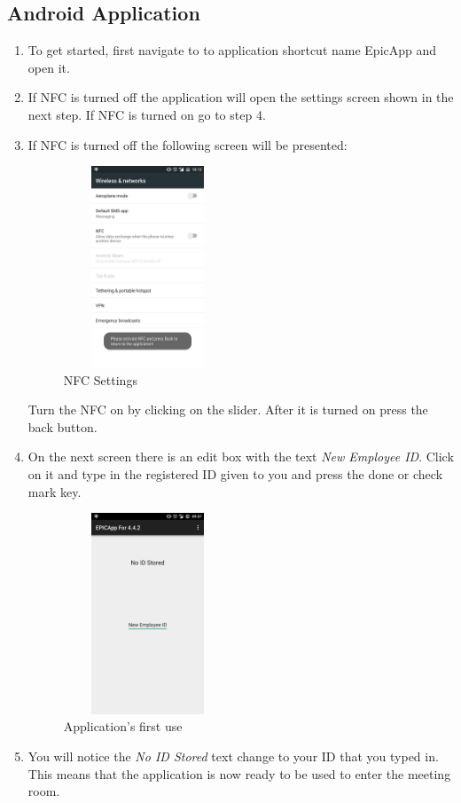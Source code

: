 \documentclass{article}
\begin{document}
\subsection{Android Application}
\begin{enumerate}
\item To get started, first navigate to to application shortcut name EpicApp and open it.
\item If NFC is turned off the application will open the settings screen shown in the next step. If NFC is turned on go to step 4.
\item {If NFC is turned off the following screen will be presented:
\begin{figure}[H]
\center
\includegraphics[width=5cm, height=6cm]{Settings}
\caption{NFC Settings}
\label{fig:my_label}
\end{figure}}
Turn the NFC on by clicking on the slider. After it is turned on press the back button.
\item{ On the next screen there is an edit box with the text \textit{New Employee ID}. Click on it and type in the registered ID given to you and press the done or check mark key.
\begin{figure}[H]
\center
\includegraphics[width=5cm, height=6cm]{firstOpen}
\caption{Application's first use}
\label{fig:my_label2}
\end{figure}}
\item You will notice the \textit{No ID Stored} text change to your ID that you typed in. This means that the application is now ready to be used to enter the meeting room.
\end{enumerate}
\end{document}
